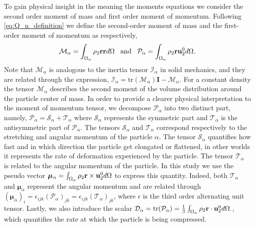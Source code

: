 
To gain physical insight in the meaning the moments equations we consider the second order moment of mass and first order moment of momentum.
Following \ref{eq:Q_n_definition} we define the second-order moment of mass and the first-order moment of momentum as respectively,
\begin{equation}
    \mathcal{M}_\alpha 
    = \int_{\Omega_\alpha}  \rho_2 \textbf{r} \textbf{r}  d\Omega
    \;\;\;\text{and}\;\;\;
    \mathcal{P}_\alpha 
    = \int_{\Omega_\alpha}  \rho_2 \textbf{r} \textbf{u}_2^0  d\Omega.
    \label{eq:first_moment_of_momentum_def}
\end{equation}
Note that $\mathcal{M}_\alpha$ is analogous to the inertia tensor $\mathcal{I}_\alpha$ in solid mechanics, and they are related through the expression, $\mathcal{I}_\alpha = \text{tr}(\mathcal{M}_\alpha)\textbf{I} - \mathcal{M}_\alpha$.
For a constant density the tensor $\mathcal{M}_\alpha$ describes the second moment of the volume distribution around the particle center of mass.
In order to provide a clearer physical interpretation to the moment of momentum tensor, we decompose $\mathcal{P}_\alpha$ into two distinct part, namely,
$\mathcal{P}_\alpha = \mathcal{S}_\alpha+\mathcal{T}_\alpha$ where $\mathcal{S}_\alpha$ represents the symmetric part and $\mathcal{T}_\alpha$ is the antisymmetric part of $\mathcal{P}_\alpha$.
The tensors $\mathcal{S}_\alpha$ and $\mathcal{T}_\alpha$ correspond respectively to the stretching and angular momentum of the particle $\alpha$. 
The tensor $\mathcal{S}_\alpha$ quantifies how fast and in which direction the particle get elongated or flattened, in other worlds it represents the rate of deformation experienced by the particle.
The tensor $\mathcal{T}_\alpha$ is related to the angular momentum of the particle. 
In this study we use the pseudo vector $\bm{\mu}_\alpha = \int_{\Omega_\alpha}  \rho_2 \textbf{r} \times \textbf{u}_2^0  d\Omega$ to express this quantity. 
Indeed, both  $\mathcal{T}_\alpha$ and $\bm{\mu}_\alpha$ represent the angular momentum and are related through $(\bm{\mu}_\alpha)_i = \epsilon_{ijk} (\mathcal{P}_\alpha)_{jk}= \epsilon_{ijk} (\mathcal{T}_\alpha)_{jk}$, where $\epsilon$ is the third order alternating unit tensor. 
Lastly, we also introduce the scalar $\mathcal{D}_\alpha = \text{tr}(\mathcal{P}_\alpha) = \frac{1}{3}\int_{\Omega_\alpha}  \rho_2 \textbf{r} \cdot \textbf{u}_2^0  d\Omega.$, which quantifies the rate at which the particle is being compressed.


